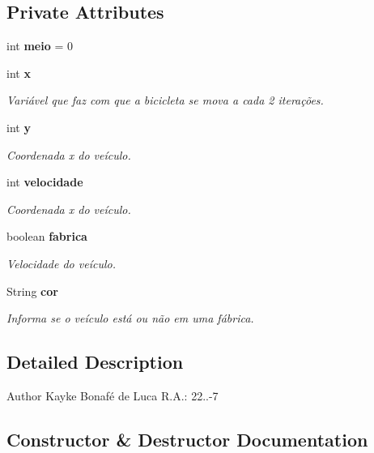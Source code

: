 \subsection*{Private Attributes}
\begin{DoxyCompactItemize}
\item 
int \textbf{ meio} = 0
\item 
int \textbf{ x}
\begin{DoxyCompactList}\small\item\em Variável que faz com que a bicicleta se mova a cada 2 iterações. \end{DoxyCompactList}\item 
int \textbf{ y}
\begin{DoxyCompactList}\small\item\em Coordenada x do veículo. \end{DoxyCompactList}\item 
int \textbf{ velocidade}
\begin{DoxyCompactList}\small\item\em Coordenada x do veículo. \end{DoxyCompactList}\item 
boolean \textbf{ fabrica}
\begin{DoxyCompactList}\small\item\em Velocidade do veículo. \end{DoxyCompactList}\item 
String \textbf{ cor}
\begin{DoxyCompactList}\small\item\em Informa se o veículo está ou não em uma fábrica. \end{DoxyCompactList}\end{DoxyCompactItemize}


\subsection{Detailed Description}
\begin{DoxyAuthor}{Author}
Kayke Bonafé de Luca R.\+A.\+: 22..-\/7 
\end{DoxyAuthor}


\subsection{Constructor \& Destructor Documentation}
\mbox{\label{classprojetocc3642_1_1_veiculo_ae77d6bc7396626fb11fa5800dc3ecac4}} 
